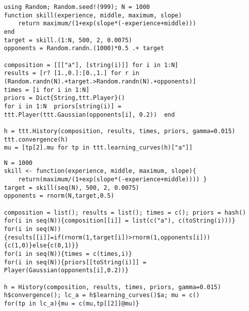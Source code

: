 \documentclass[article]{jss}
\newif\ifen
\newif\ifes
\newcommand{\en}[1]{\ifen#1\fi}
\newcommand{\es}[1]{\ifes#1\fi}
\begin{document}
\en{We attach the \proglang{Julia} and \proglang{R} codes that solve the example presented in the section \ref{sec:skill_evolution} about estimation the skill evolution of a new player.}
\es{Adjuntamos los códigos de \proglang{Julia} y \proglang{R} que resuelven el ejemplo presentado en la sección \ref{sec:skill_evolution} sobre la evolución de habilidad de un jugador nuevo.}
%
\begin{lstlisting}[backgroundcolor=\color{julia},caption={\en{\proglang{Julia} code}\es{Código \proglang{Julia}}},aboveskip=0.0 \baselineskip, belowskip=0.1cm]
using Random; Random.seed!(999); N = 1000
function skill(experience, middle, maximum, slope)
    return maximum/(1+exp(slope*(-experience+middle))) 
end
target = skill.(1:N, 500, 2, 0.0075)
opponents = Random.randn.(1000)*0.5 .+ target

composition = [[["a"], [string(i)]] for i in 1:N]
results = [r? [1.,0.]:[0.,1.] for r in (Random.randn(N).+target.>Random.randn(N).+opponents)]
times = [i for i in 1:N]
priors = Dict{String,ttt.Player}()
for i in 1:N  priors[string(i)] = ttt.Player(ttt.Gaussian(opponents[i], 0.2))  end

h = ttt.History(composition, results, times, priors, gamma=0.015)
ttt.convergence(h)
mu = [tp[2].mu for tp in ttt.learning_curves(h)["a"]]
\end{lstlisting}
%
\begin{lstlisting}[backgroundcolor=\color{r},caption={\en{\proglang{R} code}\es{Código \proglang{R}}},aboveskip=0.0 \baselineskip, belowskip=0.1cm]
N = 1000
skill <- function(experience, middle, maximum, slope){
    return(maximum/(1+exp(slope*(-experience+middle)))) }
target = skill(seq(N), 500, 2, 0.0075)
opponents = rnorm(N,target,0.5)

composition = list(); results = list(); times = c(); priors = hash()
for(i in seq(N)){composition[[i]] = list(c("a"), c(toString(i)))}
for(i in seq(N)){results[[i]]=if(rnorm(1,target[i])>rnorm(1,opponents[i])){c(1,0)}else{c(0,1)}}
for(i in seq(N)){times = c(times,i)}
for(i in seq(N)){priors[[toString(i)]] = Player(Gaussian(opponents[i],0.2))}
    
h = History(composition, results, times, priors, gamma=0.015)
h$convergence(); lc_a = h$learning_curves()$a; mu = c()
for(tp in lc_a){mu = c(mu,tp[[2]]@mu)}
\end{lstlisting}
\end{document}
